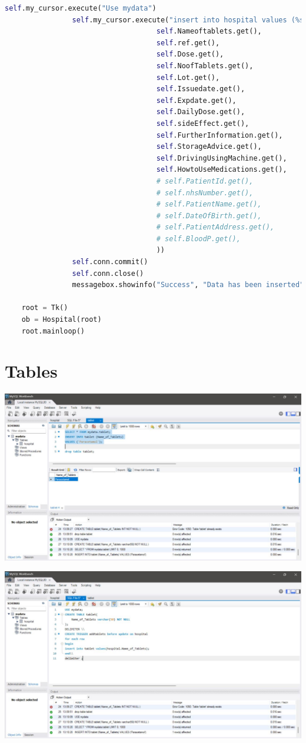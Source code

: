 \documentclass{article}
\begin{document}
\begin{lstlisting}[language=Python, caption=Hospital Management.py]
				self.my_cursor.execute("Use mydata")
				self.my_cursor.execute("insert into hospital values (%s,%s,%s,%s,%s,%s,%s,%s,%s,%s,%s, %s, %s)", (
									self.Nameoftablets.get(),
									self.ref.get(),
									self.Dose.get(),
									self.NoofTablets.get(),
									self.Lot.get(),
									self.Issuedate.get(),
									self.Expdate.get(),
									self.DailyDose.get(),
									self.sideEffect.get(),
									self.FurtherInformation.get(),
									self.StorageAdvice.get(),
									self.DrivingUsingMachine.get(),
									self.HowtoUseMedications.get(),
									# self.PatientId.get(),
									# self.nhsNumber.get(),
									# self.PatientName.get(),
									# self.DateOfBirth.get(),
									# self.PatientAddress.get(),
									# self.BloodP.get(),
									))
				self.conn.commit()
				self.conn.close()
				messagebox.showinfo("Success", "Data has been inserted")
	
	root = Tk()
	ob = Hospital(root)
	root.mainloop()
\end{lstlisting}

\section{\textbf{Tables}}
\begin{center}
	\includegraphics[scale = 0.4]{C1.jpg}
\end{center}

\begin{center}
	\includegraphics*[scale = 0.4]{C2.jpg}
\end{center}
\end{document}

